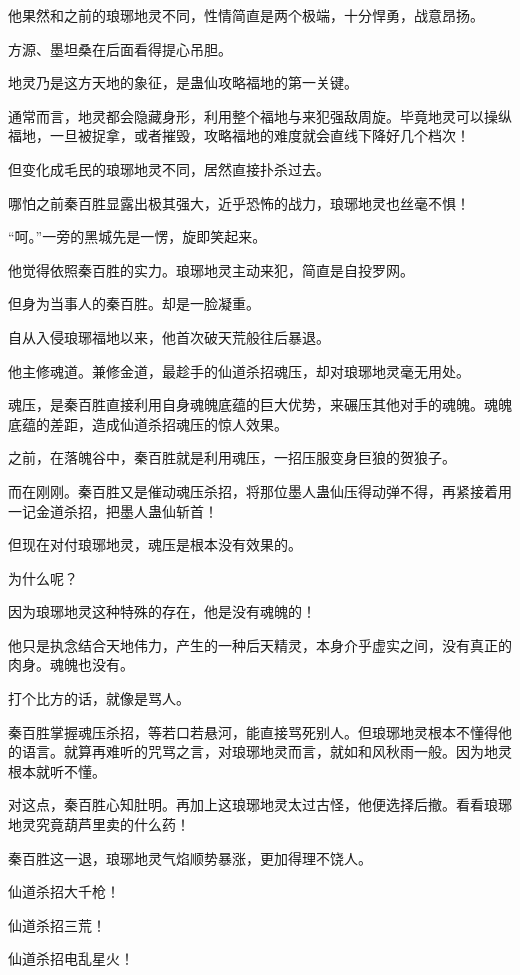 \begin{this_body}
他果然和之前的琅琊地灵不同，性情简直是两个极端，十分悍勇，战意昂扬。

方源、墨坦桑在后面看得提心吊胆。

地灵乃是这方天地的象征，是蛊仙攻略福地的第一关键。

通常而言，地灵都会隐藏身形，利用整个福地与来犯强敌周旋。毕竟地灵可以操纵福地，一旦被捉拿，或者摧毁，攻略福地的难度就会直线下降好几个档次！

但变化成毛民的琅琊地灵不同，居然直接扑杀过去。

哪怕之前秦百胜显露出极其强大，近乎恐怖的战力，琅琊地灵也丝毫不惧！

“呵。”一旁的黑城先是一愣，旋即笑起来。

他觉得依照秦百胜的实力。琅琊地灵主动来犯，简直是自投罗网。

但身为当事人的秦百胜。却是一脸凝重。

自从入侵琅琊福地以来，他首次破天荒般往后暴退。

他主修魂道。兼修金道，最趁手的仙道杀招魂压，却对琅琊地灵毫无用处。

魂压，是秦百胜直接利用自身魂魄底蕴的巨大优势，来碾压其他对手的魂魄。魂魄底蕴的差距，造成仙道杀招魂压的惊人效果。

之前，在落魄谷中，秦百胜就是利用魂压，一招压服变身巨狼的贺狼子。

而在刚刚。秦百胜又是催动魂压杀招，将那位墨人蛊仙压得动弹不得，再紧接着用一记金道杀招，把墨人蛊仙斩首！

但现在对付琅琊地灵，魂压是根本没有效果的。

为什么呢？

因为琅琊地灵这种特殊的存在，他是没有魂魄的！

他只是执念结合天地伟力，产生的一种后天精灵，本身介乎虚实之间，没有真正的肉身。魂魄也没有。

打个比方的话，就像是骂人。

秦百胜掌握魂压杀招，等若口若悬河，能直接骂死别人。但琅琊地灵根本不懂得他的语言。就算再难听的咒骂之言，对琅琊地灵而言，就如和风秋雨一般。因为地灵根本就听不懂。

对这点，秦百胜心知肚明。再加上这琅琊地灵太过古怪，他便选择后撤。看看琅琊地灵究竟葫芦里卖的什么药！

秦百胜这一退，琅琊地灵气焰顺势暴涨，更加得理不饶人。

仙道杀招大千枪！

仙道杀招三荒！

仙道杀招电乱星火！


\end{this_body}
